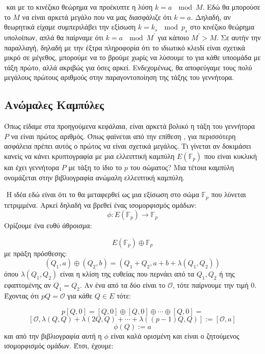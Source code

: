 \documentclass[oneside,a4paper]{article}
\begin{document}
$ $\newline
και με το κινέζικο θεώρημα να προέκυπτε η λύση $k=a \ \mod M$. Εδώ θα μπορούσε το $M$ να είναι αρκετά μεγάλο που να μας διασφάλιζε ότι $k=a$. Δηλαδή, αν θεωρητικά είχαμε συμπεριλάβει την εξίσωση $k=k_s \ \mod p_s$ στο κινέζικο θεώρημα υπολοίπων, απλά θα παίρναμε ότι $k = a \ \mod M^{\prime}$ για κάποιο $M^{\prime}>M$. Σε αυτήν την παραλλαγή, δηλαδή με την έξτρα πληροφορία ότι το ιδιωτικό κλειδί είναι σχετικά μικρό σε μέγεθος, μπορούμε να το βρούμε χωρίς να λύσουμε το  για κάθε υποομάδα με τάξη πρώτο, αλλά ακριβώς για όσες αρκεί. Ενδεχομένως, θα αποφεύγαμε τους πολύ μεγάλους πρώτους αριθμούς στην παραγοντοποίηση της τάξης του γεννήτορα. 

\vspace*{0.3cm}
\subsection{Ανώμαλες Καμπύλες}

\vspace*{0.3cm}
\noindent Όπως είδαμε στα προηγούμενα κεφάλαια, είναι αρκετά βολικό η τάξη του γεννήτορα $P$ να είναι πρώτος αριθμός. Όπως φαίνεται από την επίθεση , για περισσότερη ασφάλεια πρέπει αυτός ο πρώτος να είναι σχετικά μεγάλος. Τι γίνεται αν δοκιμάσει κανείς να κάνει κρυπτογραφία με μια ελλειπτική καμπύλη $E(\mathbb{F}_p)$ που είναι κυκλική και έχει γεννήτορα $P$ με τάξη το ίδιο το $p$ του σώματος? Μια τέτοια καμπύλη ονομάζεται στην βιβλιογραφία ανώμαλη ελλειπτική καμπύλη.

$ $\newline
Η ιδέα εδώ είναι ότι το  θα μεταφερθεί ως μια εξίσωση στο σώμα $\mathbb{F}_p$ που λύνεται τετριμμένα. Αρκεί δηλαδή να βρεθεί ένας ισομορφισμός ομάδων:
$$\phi : E(\mathbb{F}_p) \longrightarrow \mathbb{F}_p$$
Ορίζουμε ένα ευθύ άθροισμα:

$$E(\mathbb{F}_p) \oplus \mathbb{F}_p$$ με πράξη πρόσθεσης:
$$(Q_1,a) \oplus (Q_2,b) = (Q_1+Q_2, a+b+\lambda (Q_1,Q_2))$$ όπου $\lambda(Q_1,Q_2)$ είναι η κλίση της ευθείας που περνάει από τα $Q_1, Q_2$ ή της εφαπτομένης αν $Q_1 = Q_2$. Αν ένα από τα δύο είναι το $\mathcal{O}$, τότε παίρνουμε την τιμή $0$. Έχοντας ότι $p Q = \mathcal{O}$ για κάθε $Q \in E$ τότε:

$$p[Q,0] = [Q,0] \oplus [Q,0] \oplus \cdots \oplus [Q,0] = $$
$$[\mathcal{O}, \lambda(Q,Q) + \lambda(2Q,Q) + \cdots + \lambda((p-1)Q,Q)] :=[\mathcal{O},a]$$
$$\phi(Q) := a$$ και από την βιβλιογραφία \cite{semaev} αυτή η $\phi$ είναι καλά ορισμένη και είναι ο ζητούμενος ισομορφισμός ομάδων. Έτσι, έχουμε:
\end{document}
